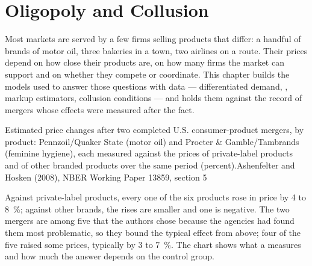 \chapter{Oligopoly and Collusion}\label{ch:b3:oligopoly-and-collusion}

Most markets are served by a few firms selling products that differ: a handful of
brands of motor oil, three bakeries in a town, two airlines on a route. Their prices
depend on how close their products are, on how many firms the market can support and
on whether they compete or coordinate. This chapter builds the models used to answer
those questions with data --- differentiated demand, , markup
estimators, collusion conditions --- and holds them against the record of mergers
whose effects were measured after the fact.

\begin{openingchart}{Estimated price changes after two completed U.S. consumer-product
mergers, by product: Pennzoil/Quaker State (motor oil) and Procter \& Gamble/Tambrands
(feminine hygiene), each measured against the prices of private-label products and of
other branded products over the same period (percent).}{Ashenfelter and Hosken (2008),
NBER Working Paper 13859, section 5}
\end{openingchart}

Against private-label products, every one of the six products rose in price by 4 to
8~\%; against other brands, the rises are smaller and one is negative. The two mergers
are among five that the authors chose because the agencies had found them most
problematic, so they bound the typical effect from above; four of the five raised
some prices, typically by 3 to 7~\%. The chart shows what a 
measures and how much the answer depends on the control group.

